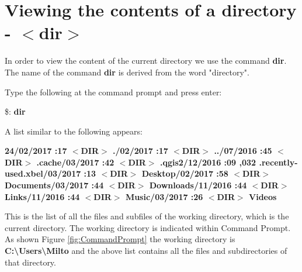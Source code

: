 \documentclass{article}
\begin{document}
	\newpage \newpage
	\section{Viewing the contents of a directory  - $<$dir$>$}
	\par In order to view the content of the current directory we use the command \textbf{dir}. The name of the command \textbf{dir} is derived from the word "directory".  
	
	\par Type the following at the command prompt and press enter:
	
	\par \$: \textbf{dir}
	 
	\par A list similar to the following appears:
	

		\setlength{\parindent}{-0.125cm}
\par \textbf{
	24/02/2017 :17 \quad  $<$DIR$>$  \quad  \qquad \quad ./02/2017 :17 \quad  $<$DIR$>$  \quad  \qquad \quad ../07/2016 :45 \quad  $<$DIR$>$  \quad  \qquad \quad .cache/03/2017 :42 \quad  $<$DIR$>$  \quad  \qquad \quad .qgis2/12/2016 :09 \quad  \qquad  {},032 \quad .recently-used.xbel/03/2017 :13 \quad  $<$DIR$>$  \quad  \qquad \quad Desktop/02/2017 :58 \quad  $<$DIR$>$  \quad  \qquad \quad Documents/03/2017 :44  \quad  $<$DIR$>$  \quad  \qquad \quad Downloads/11/2016 :44 \quad  $<$DIR$>$  \quad  \qquad \quad Links/11/2016 :44 \quad  $<$DIR$>$  \quad  \qquad \quad Music/03/2017 :26 \quad  $<$DIR$>$  \quad  \qquad \quad Videos\newline
	}

	\setlength{\parindent}{0cm}
	
	\par This is the list of all the files and subfiles of the working directory, which is the current directory. The working directory is indicated within Command Prompt. As shown Figure \ref{fig:CommandPrompt} the working directory is \textbf{C:\textbackslash Users\textbackslash Milto } and the above list contains all the files and subdirectories of that directory.
	
\end{document}

